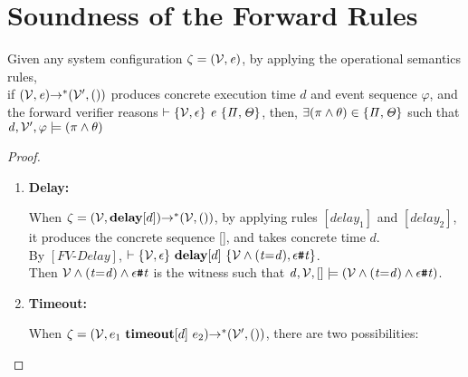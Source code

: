 \documentclass[acmsmall,10pt,review]{acmart}
\newcommand{\env}{\code{\mathcal{V}}}
\newcommand{\es}{\theta}
\newcommand{\code}[1]{{\tt{\ensuremath{\m{#1}}}}}
\newcommand{\codeme}[1]{{\tt{\ensuremath{#1}}}}
\newcommand{\m}{\mathit}
\newcommand{\mysharp}{{\mathrel{\texttt{\#}}}}
\begin{document}
{{{\section{Soundness of the Forward Rules} 
 \label{proof:SoundnessProof_FE}

Given any system configuration \code{\zeta = (\env, e)}, by applying the operational
  semantics rules, \\
  if \code{(\env, e) {\rightarrow^*} (\env^\prime, ())} produces concrete 
  execution time \code{d} and event sequence \code{\varphi}, and the forward verifier reasons \code{ \vdash  
  \s{\env, \epsilon} \ e\  \s{\Pi, \Theta}}, then, 
  \code{
   \exists (\pi \wedge \es) \in \s{\Pi, \Theta} } such that 
  \code{d, \env^\prime, \varphi  \models (\pi\wedge \es)}
  
  \begin{proof}
    ~\\
  \begin{enumerate}
  \item \textbf{Delay:}  
  
\noindent When $\zeta = (\env,  \textbf{delay}[d]) {\rightarrow^*} (\env, ()) $, by applying rules \code{[delay_1]} and \code{[delay_2]}, 
it produces the concrete sequence [], and takes concrete time \codeme{d}. \\
By \code{[FV\text{-}Delay]}, $\vdash  \s{\env, \epsilon} \ \textbf{delay}[d]\  \s{\env \wedge (t{=}d), \epsilon\mysharp t}$. \\
Then \code{\env \wedge (t{=}d) \wedge \epsilon\mysharp t} is the witness such that \code{d, \env, []  \models (\env \wedge (t{=}d) \wedge \epsilon\mysharp t)}. 
\\

\item \textbf{Timeout:}  

\noindent When $\zeta = (\env,  e_1\ \textbf{timeout}  [d] \ e_2) {\rightarrow^*} (\env^\prime, ()) $, 
there are two possibilities:


\end{enumerate}
\end{proof}}}}
\end{document}
